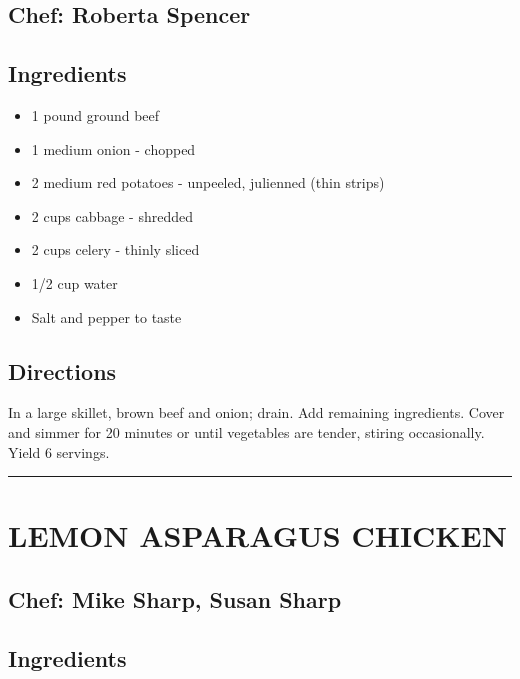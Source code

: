 \documentclass[
]{book}
\providecommand{\tightlist}{%
  \setlength{\itemsep}{0pt}\setlength{\parskip}{0pt}}
\begin{document}
\hypertarget{chef-roberta-spencer-20}{%
\subsection*{Chef: Roberta Spencer}\label{chef-roberta-spencer-20}}


\hypertarget{ingredients-59}{%
\subsection*{Ingredients}\label{ingredients-59}}


\begin{itemize}
\tightlist
\item
  1 pound ground beef
\item
  1 medium onion - chopped
\item
  2 medium red potatoes - unpeeled, julienned (thin strips)
\item
  2 cups cabbage - shredded
\item
  2 cups celery - thinly sliced
\item
  1/2 cup water
\item
  Salt and pepper to taste
\end{itemize}

\hypertarget{directions-59}{%
\subsection*{Directions}\label{directions-59}}


In a large skillet, brown beef and onion; drain. Add remaining ingredients. Cover and simmer for 20 minutes
or until vegetables are tender, stiring occasionally. Yield 6 servings.

\begin{center}\rule{0.5\linewidth}{0.5pt}\end{center}

\hypertarget{lemon-asparagus-chicken}{%
\section*{LEMON ASPARAGUS CHICKEN}\label{lemon-asparagus-chicken}}


\hypertarget{chef-mike-sharp-susan-sharp}{%
\subsection*{Chef: Mike Sharp, Susan Sharp}\label{chef-mike-sharp-susan-sharp}}


\hypertarget{ingredients-60}{%
\subsection*{Ingredients}\label{ingredients-60}}
\end{document}
